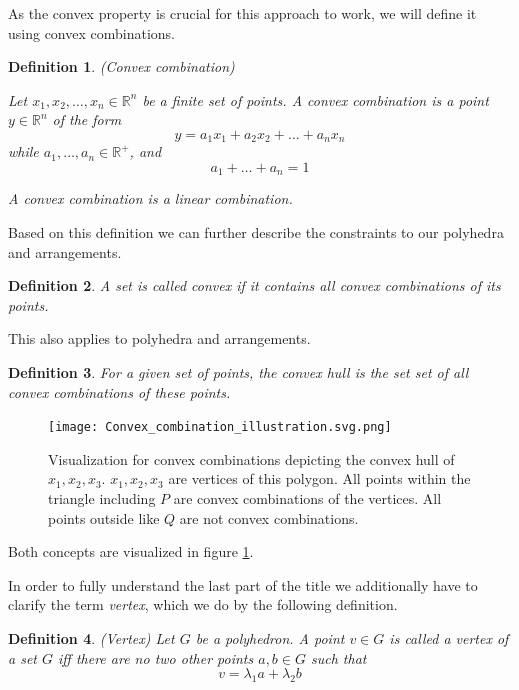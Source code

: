\documentclass[a4paper, 11pt]{article}
\newtheorem{mydef}{Definition}
\begin{document}
As the convex property is crucial for this approach to work, we will define it using convex combinations.
\begin{mydef}(Convex combination)\medskip
	
	Let $x_1, x_2, \dots, x_n\in\mathbb{R}^n$ be a finite set of points. A convex combination is a point $y\in\mathbb{R}^n$ of the form 
	\begin{equation*}
		y = a_1x_1 + a_2x_2 + \dots + a_nx_n
	\end{equation*}
	while $a_1, \dots, a_n\in\mathbb{R^+}$, and
	\begin{equation*}
		a_1 + \dots + a_n = 1
	\end{equation*}
	
	A convex combination is a linear combination.
\end{mydef}
Based on this definition we can further describe the constraints to our polyhedra and arrangements.
\begin{mydef}
	A set is called \emph{convex} if it contains all convex combinations of its points.
\end{mydef}
This also applies to polyhedra and arrangements.
\begin{mydef}
	For a given set of points, the convex hull is the set set of all convex combinations of these points.
\end{mydef}

\begin{figure}
	\centering
	\texttt{[image: Convex\_combination\_illustration.svg.png]}
	\label{convexComb}
	\caption{Visualization for convex combinations depicting the convex hull of $x_1, x_2, x_3$. $x_1,x_2,x_3$ are vertices of this polygon. All points within the triangle including $P$ are convex combinations of the vertices. All points outside like $Q$ are not convex combinations. }
\end{figure}

Both concepts are visualized in figure \ref{convexComb}.

In order to fully understand the last part of the title we additionally have to clarify the term \textit{vertex}, which we do by the following definition.

\begin{mydef}(Vertex)\medskip
	\label{vertex}
	Let $G$ be a polyhedron. A point $v\in G$ is called a \textit{vertex} of a set $G$ iff there are no two other points $a,b\in G$ such that
	\begin{equation}
		v=\lambda_1 a + \lambda_2 b
	\end{equation}
\end{mydef}
\end{document}
